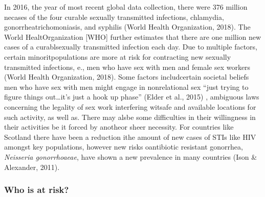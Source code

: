 \documentclass[
  donotrepeattitle,doc, 12pt, a4paper,floatsintext]{apa7}
\begin{document}
In 2016, the year of most recent global data collection, there were 376 million necases of the four curable sexually transmitted infections, chlamydia, gonorrheatrichomoniasis, and syphilis (World Health Organization, 2018). The World HealtOrganization {[}WHO{]} further estimates that there are one million new cases of a curablsexually transmitted infection each day. Due to multiple factors, certain minoritpopulations are more at risk for contracting new sexually transmitted infections, e., men who have sex with men and female sex workers (World Health Organization, 2018). Some factors includcertain societal beliefs men who have sex with men might engage in nonrelational sex ``just trying to figure things out\ldots it's just a hook up phase'' (Elder et al., 2015) , ambiguous laws concerning the legality of sex work interfering witsafe and available locations for such activity, as well as. There may alsbe some difficulties in their willingness in their activities be it forced by anotheor sheer necessity. For countries like Scotland there have been a reduction ithe amount of new cases of STIs like HIV amongst key populations, however new risks oantibiotic resistant gonorrhea, \emph{Neisseria gonorrhoaeae}, have shown a new prevalence in many countries (Ison \& Alexander, 2011).

\hypertarget{who-is-at-risk}{%
\subsubsection{Who is at risk?}\label{who-is-at-risk}}
\end{document}
